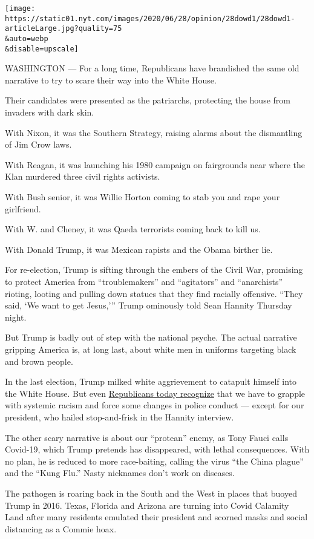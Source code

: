\texttt{[image: https://static01.nyt.com/images/2020/06/28/opinion/28dowd1/28dowd1-articleLarge.jpg?quality=75\\\&auto=webp\\\&disable=upscale]}

WASHINGTON --- For a long time, Republicans have brandished the same old
narrative to try to scare their way into the White House.

Their candidates were presented as the patriarchs, protecting the house
from invaders with dark skin.

With Nixon, it was the Southern Strategy, raising alarms about the
dismantling of Jim Crow laws.

With Reagan, it was launching his 1980 campaign on fairgrounds near
where the Klan murdered three civil rights activists.

With Bush senior, it was Willie Horton coming to stab you and rape your
girlfriend.

With W. and Cheney, it was Qaeda terrorists coming back to kill us.

With Donald Trump, it was Mexican rapists and the Obama birther lie.

For re-election, Trump is sifting through the embers of the Civil War,
promising to protect America from ``troublemakers'' and ``agitators''
and ``anarchists'' rioting, looting and pulling down statues that they
find racially offensive. ``They said, `We want to get Jesus,''' Trump
ominously told Sean Hannity Thursday night.

But Trump is badly out of step with the national psyche. The actual
narrative gripping America is, at long last, about white men in uniforms
targeting black and brown people.

In the last election, Trump milked white aggrievement to catapult
himself into the White House. But even
\href{https://www.nytimes.com/2020/06/11/us/politics/trump-on-race.html}{Republicans
today recognize} that we have to grapple with systemic racism and force
some changes in police conduct --- except for our president, who hailed
stop-and-frisk in the Hannity interview.

The other scary narrative is about our ``protean'' enemy, as Tony Fauci
calls Covid-19, which Trump pretends has disappeared, with lethal
consequences. With no plan, he is reduced to more race-baiting, calling
the virus ``the China plague'' and the ``Kung Flu.'' Nasty nicknames
don't work on diseases.

The pathogen is roaring back in the South and the West in places that
buoyed Trump in 2016. Texas, Florida and Arizona are turning into Covid
Calamity Land after many residents emulated their president and scorned
masks and social distancing as a Commie hoax.


